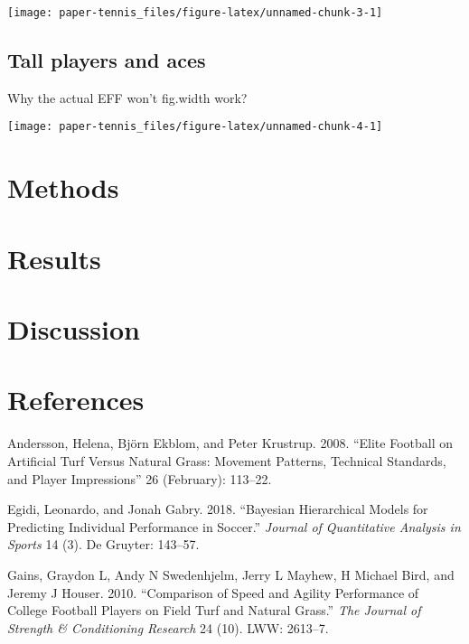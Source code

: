 \documentclass[]{article}
\begin{document}
\begin{center}\texttt{[image: paper-tennis\_files/figure-latex/unnamed-chunk-3-1]} \end{center}

\subsection{Tall players and aces}\label{tall-players-and-aces}

Why the actual EFF won't fig.width work?

\begin{center}\texttt{[image: paper-tennis\_files/figure-latex/unnamed-chunk-4-1]} \end{center}

\hypertarget{sec:methods}{\section{Methods}\label{sec:methods}}

\hypertarget{sec:results}{\section{Results}\label{sec:results}}

\section{Discussion}\label{sec:discussion}

\section{References}\label{sec:refs}

\footnotesize

\hypertarget{refs}{}
\hypertarget{ref-andersson2008}{}
Andersson, Helena, Björn Ekblom, and Peter Krustrup. 2008. ``Elite
Football on Artificial Turf Versus Natural Grass: Movement Patterns,
Technical Standards, and Player Impressions'' 26 (February): 113--22.

\hypertarget{ref-egidi2018}{}
Egidi, Leonardo, and Jonah Gabry. 2018. ``Bayesian Hierarchical Models
for Predicting Individual Performance in Soccer.'' \emph{Journal of
Quantitative Analysis in Sports} 14 (3). De Gruyter: 143--57.

\hypertarget{ref-gains2010}{}
Gains, Graydon L, Andy N Swedenhjelm, Jerry L Mayhew, H Michael Bird,
and Jeremy J Houser. 2010. ``Comparison of Speed and Agility Performance
of College Football Players on Field Turf and Natural Grass.'' \emph{The
Journal of Strength \& Conditioning Research} 24 (10). LWW: 2613--7.
\end{document}
